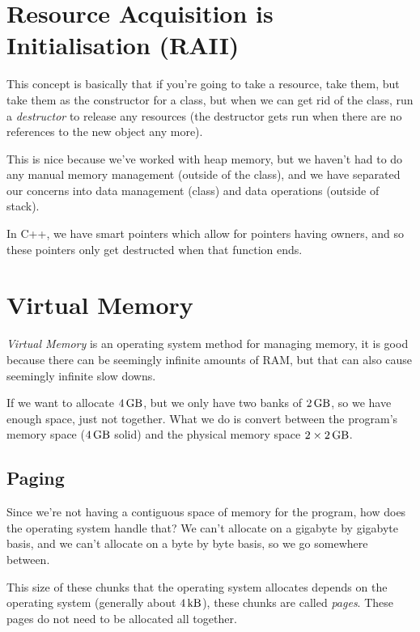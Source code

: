 \section{Resource Acquisition is Initialisation (RAII)}\label{sec:resource_acquisition_is_initialisation}

This concept is basically that if you're going to take a resource, take them, but take them as the constructor for a class, but when we can get rid of the class, run a \emph{destructor} to release any resources (the destructor gets run when there are no references to the new object any more).

This is nice because we've worked with heap memory, but we haven't had to do any manual memory management (outside of the class), and we have separated our concerns into data management (class) and data operations (outside of stack).
\begin{note}
    In C++, we have smart pointers which allow for pointers having owners, and so these pointers only get destructed when that function ends.
\end{note}

\section{Virtual Memory}\label{sec:virtual_memory}

\emph{Virtual Memory} is an operating system method for managing memory, it is good because there can be seemingly infinite amounts of RAM, but that can also cause seemingly infinite slow downs.

If we want to allocate \(\SI{4}{\giga\byte}\), but we only have two banks of \(\SI{2}{\giga\byte}\), so we have enough space, just not together.
What we do is convert between the program's memory space (\(\SI{4}{\giga\byte}\) solid) and the physical memory space \(2 \times \SI{2}{\giga\byte}\).

\subsection{Paging}\label{sub:virtual_memory_paging}

Since we're not having a contiguous space of memory for the program, how does the operating system handle that?
We can't allocate on a gigabyte by gigabyte basis, and we can't allocate on a byte by byte basis, so we go somewhere between.

This size of these chunks that the operating system allocates depends on the operating system (generally about \(\SI{4}{\kilo\byte}\)), these chunks are called \emph{pages}.
These pages do not need to be allocated all together.

